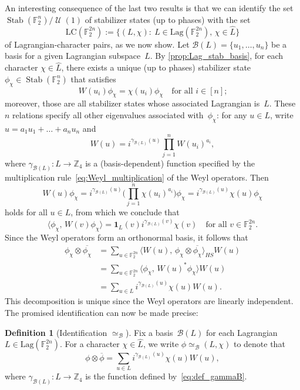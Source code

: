 \documentclass[11pt]{amsart}
\newcommand{\Lag}{\mathrm{Lag}}
\DeclareMathOperator{\Stab}{Stab}\DeclareMathOperator{\Spec}{Spec}
\newcommand{\Z}{\mathbb{Z}} %
\newcommand{\F}{\mathbb{F}} %
\newcommand{\one}{\mathbf{1}}
\DeclareMathOperator{\U}{\mathcal{U}}
\newcommand{\B}{\mathcal B}
\theoremstyle{plain}
\theoremstyle{definition}
\newtheorem{definition}[theorem]{Definition}
\theoremstyle{remark}
\begin{document}
An interesting consequence of the last two results is that we can identify the set $\Stab(\F_2^n)/\U(1)$ of stabilizer states (up to phases) with the set
$$\mathrm{LC}(\F_2^{2n}) := \big\{(L, \chi):\: L\in \Lag(\F_2^{2n}),\, \chi\in \widehat{L}\big\}$$
of Lagrangian-character pairs, as we now show.
Let $\B(L) = \{u_1, \dots, u_n\}$ be a basis for a given Lagrangian subspace~$L$.
By \cref{prop:Lag_stab_basis}, for each character $\chi \in \widehat{L}$, there exists a unique (up to phases) stabilizer state $\phi_\chi \in \Stab(\F_2^n)$ that satisfies
$$W(u_i) \phi_\chi = \chi(u_i) \phi_\chi \quad \text{for all $i\in [n]$;}$$
moreover, those are all stabilizer states whose associated Lagrangian is~$L$.
These~$n$ relations specify all other eigenvalues associated with~$\phi_\chi$:
for any $u\in L$, write $u = a_1u_1 + \dots + a_nu_n$ and
\begin{equation} \label{eq:def_gammaB}
    W(u) = i^{\gamma_{\B(L)}(u)} \prod_{j=1}^n W(u_i)^{a_i},
\end{equation}
where $\gamma_{\B(L)}: L \to \Z_4$ is a (basis-dependent) function specified by the multiplication rule~\eqref{eq:Weyl_multiplication} of the Weyl operators.
Then
$$W(u) \phi_\chi = i^{\gamma_{\B(L)}(u)} \bigg(\prod_{j=1}^n \chi(u_i)^{a_i}\bigg) \phi_\chi = i^{\gamma_{\B(L)}(u)} \chi(u) \phi_\chi$$
holds for all $u\in L$, from which we conclude that
$$\langle\phi_\chi,\, W(v)\phi_\chi\rangle = \one_L(v) i^{\gamma_{\B(L)}(v)} \chi(v) \quad \text{for all $v\in \F_2^{2n}$.}$$
Since the Weyl operators form an orthonormal basis, it follows that
\begin{align*}
    \phi_\chi \otimes \overline{\phi_\chi}
    &= \sum_{u\in \F_2^{2n}} \big\langle W(u),\, \phi_\chi \otimes \overline{\phi_\chi}\big\rangle_{HS} W(u) \\
    &= \sum_{u\in \F_2^{2n}} \langle \phi_\chi,\, W(u)^* \phi_\chi \rangle W(u) \\
    &= \sum_{u\in L} i^{\gamma_{\B(L)}(u)} \chi(u) W(u).
\end{align*}
This decomposition is unique since the Weyl operators are linearly independent.
The promised identification can now be made precise:

\begin{definition}[Identification $\simeq_\B$] \label{def:identification}
    Fix a basis~$\B(L)$ for each Lagrangian $L\in \Lag(\F_2^{2n})$.
    For a character $\chi\in \widehat{L}$, we write $\phi \simeq_\B (L, \chi)$ to denote that
    \begin{equation}\label{eq:stab_id}
    \phi \otimes \overline{\phi} = \sum_{u\in L} i^{\gamma_{\B(L)}(u)} \chi(u) W(u),
    \end{equation}
    where $\gamma_{\B(L)}: L \to \Z_4$ is the function defined by~\eqref{eq:def_gammaB}.
\end{definition}
\end{document}
